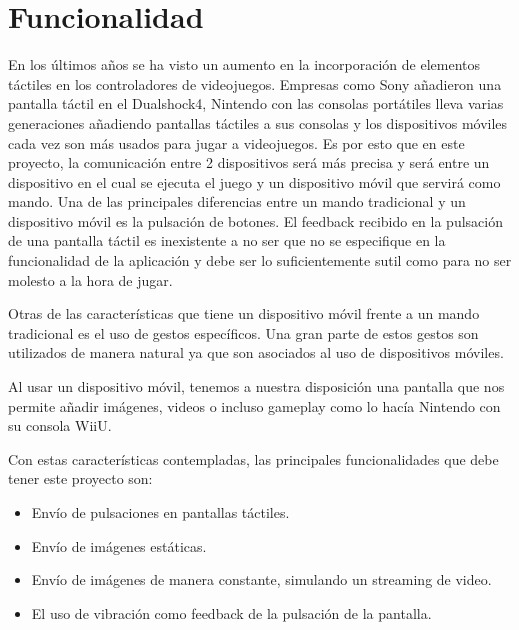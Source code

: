 \section{Funcionalidad}

En los \'ultimos a\~nos se ha visto un aumento en la incorporaci\'on de elementos t\'actiles en los controladores de videojuegos. Empresas como Sony a\~nadieron una pantalla t\'actil en el Dualshock4, Nintendo con las consolas port\'atiles lleva varias generaciones a\~nadiendo pantallas t\'actiles a sus consolas y los dispositivos m\'oviles cada vez son m\'as usados para jugar a videojuegos.
Es por esto que en este proyecto, la comunicaci\'on entre 2 dispositivos ser\'a m\'as precisa y ser\'a entre un dispositivo en el cual se ejecuta el juego y un dispositivo m\'ovil que servir\'a como mando. Una de las principales diferencias entre un mando tradicional y un dispositivo m\'ovil es la pulsaci\'on de botones. El feedback recibido en la pulsaci\'on de una pantalla t\'actil es inexistente a no ser que no se especifique en la funcionalidad de la aplicaci\'on y debe ser lo suficientemente sutil como para no ser molesto a la hora de jugar.

Otras de las caracter\'isticas que tiene un dispositivo m\'ovil frente a un mando tradicional es el uso de gestos espec\'ificos. Una gran parte de estos gestos son utilizados de manera natural ya que son asociados al uso de dispositivos m\'oviles. 

Al usar un dispositivo m\'ovil, tenemos a nuestra disposici\'on una pantalla que nos permite a\~nadir im\'agenes, videos o incluso gameplay como lo hac\'ia Nintendo con su consola WiiU.

Con estas caracter\'isticas contempladas, las principales funcionalidades que debe tener este proyecto son:

\begin {itemize}
\item Env\'io de pulsaciones en pantallas t\'actiles.
\item Env\'io de im\'agenes est\'aticas.
\item Env\'io de im\'agenes de manera constante, simulando un streaming de video.
\item El uso de vibraci\'on como feedback de la pulsaci\'on de la pantalla.
\end {itemize}

